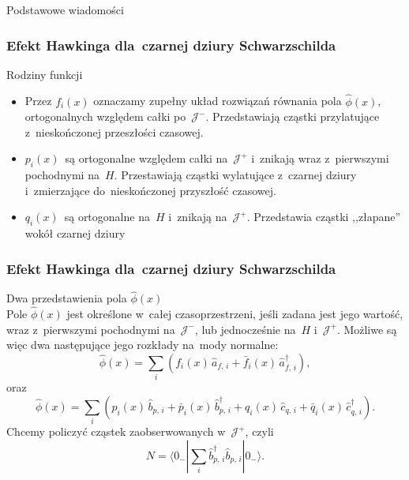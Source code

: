 \documentclass[10pt,t]{beamer}
\begin{document}
\begin{frame}{Podstawowe wiadomości}
  \frametitle{Efekt Hawkinga dla~czarnej dziury Schwarzschilda}


  Rodziny funkcji
  \begin{itemize}
    \RaggedRight

  \item Przez $f_{ i }( x )$ oznaczamy zupełny układ rozwiązań
    równania pola $\widehat{ \phi }( x )$, ortogonalnych względem
    całki po~$\mathcal{J}^{ - }$. Przedstawiają cząstki przylatujące
    z~nieskończonej przeszłości czasowej.

  \item $p_{ i }( x )$~są ortogonalne względem całki
    na~$\mathcal{J}^{ + }$ i~znikają wraz z~pierwszymi pochodnymi
    na~$H$. Przestawiają cząstki wylatujące z~czarnej dziury
    i~zmierzające do~nieskończonej przyszłość czasowej.

  \item $q_{ i }( x )$~są ortogonalne na~$H$ i~znikają
    na~$\mathcal{J}^{ + }$. Przedstawia cząstki ,,złapane'' wokół
    czarnej dziury

  \end{itemize}

\end{frame}





\begin{frame}
  \frametitle{Efekt Hawkinga dla~czarnej dziury Schwarzschilda}


  Dwa przedstawienia pola $\widehat{ \phi }( x )$ \\
  Pole $\widehat{ \phi }( x )$ jest określone w~całej czasoprzestrzeni,
  jeśli zadana jest jego wartość, wraz z~pierwszymi pochodnymi
  na~$\mathcal{J}^{ - }$, lub jednocześnie
  na~$H$ i~$\mathcal{J}^{ + }$. Możliwe są więc dwa następujące jego
  rozkłady na~mody normalne:
  \begin{equation}
    \label{eq:Promieniowanie-Hawkinga-17}
    \widehat{ \phi }( x ) =
    \sum_{ i }( f_{ i }( x )\, \widehat{ a }_{ f,\, i }
    + \bar{ f }_{ i }( x )\, \widehat{ a }^{ \dagger }_{ f,\, i } ),
  \end{equation}
  oraz
  \begin{equation}
    \label{eq:Promieniowanie-Hawkinga-18}
    \widehat{ \phi }( x ) =
    \sum_{ i }( p_{ i }( x )\, \widehat{ b }_{ p,\, i }
    + \bar{ p }_{ i }( x )\, \widehat{ b }^{ \dagger }_{ p,\, i }
    + q_{ i }( x )\, \widehat{ c }_{ q,\, i }
    + \bar{ q }_{ i }( x )\, \widehat{ c }^{ \dagger }_{ q,\, i } ).
  \end{equation}
  Chcemy policzyć cząstek zaobserwowanych w~$\mathcal{J}^{ + }$,
  czyli
  \begin{equation}
    \label{eq:Promieniowanie-Hawkinga-19}
    N =
    \langle 0_{ - } | \sum_{ i } \widehat{ b }^{ \dagger }_{ p,\, i }
    \widehat{ b }_{ p,\, i } | 0_{ - } \rangle.
  \end{equation}

\end{frame}
\end{document}
